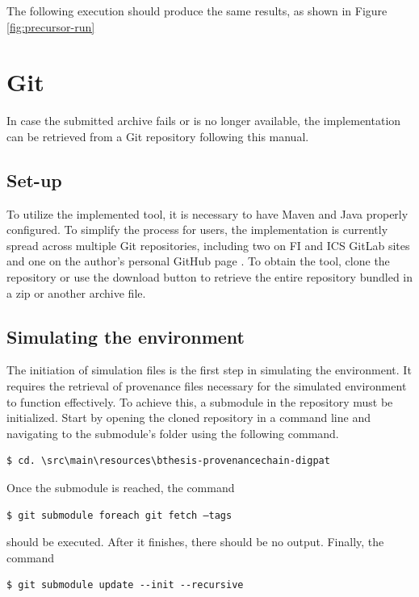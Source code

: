 \documentclass[
  digital,     %
  oneside,     %
  nosansbold,  %
  nocolorbold, %
  lof,         %
  lot,         %
]{fithesis4}
\begin{document}
The following execution should produce the same results, as shown in Figure \ref{fig:precursor-run}

\section{Git}
In case the submitted archive fails or is no longer available, the implementation can be retrieved from a Git repository following this manual.

\subsection{Set-up}
To utilize the implemented tool, it is necessary to have Maven and Java properly configured. To simplify the process for users, the implementation is currently spread across multiple Git repositories, including two on FI \cite{provchain-fi} and ICS \cite{provchain-ics} GitLab sites and one on the author's personal GitHub page \cite{provchain-github}. To obtain the tool, clone the repository or use the download button to retrieve the entire repository bundled in a zip or another archive file.

\subsection{Simulating the environment}
The initiation of simulation files is the first step in simulating the environment. It requires the retrieval of provenance files necessary for the simulated environment to function effectively. To achieve this, a submodule in the repository must be initialized. Start by opening the cloned repository in a command line and navigating to the submodule's folder using the following command.

\begin{verbatim}
$ cd. \src\main\resources\bthesis-provenancechain-digpat  
\end{verbatim}

Once the submodule is reached, the command 

\begin{verbatim}
$ git submodule foreach git fetch –tags
\end{verbatim}

should be executed. After it finishes, there should be no output. Finally, the command

\begin{verbatim}
$ git submodule update --init --recursive  
\end{verbatim}
\end{document}
